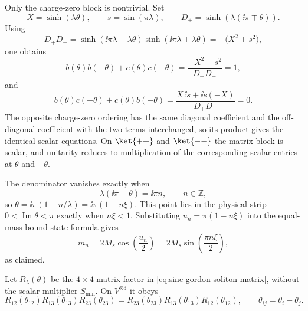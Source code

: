 Only the charge-zero block is nontrivial.  Set
\[
  X=\sinh(\lambda\theta),
  \qquad
  s=\sin(\pi\lambda),
  \qquad
  D_\pm=\sinh(\lambda(\ii\pi\mp\theta)).
\]
Using
\[
  D_+D_-
  =
  \sinh(\ii\pi\lambda-\lambda\theta)
  \sinh(\ii\pi\lambda+\lambda\theta)
  =
  -\bigl(X^2+s^2\bigr),
\]
one obtains
\[
  b(\theta)b(-\theta)+c(\theta)c(-\theta)
  =
  \frac{-X^2-s^2}{D_+D_-}=1,
\]
and
\[
  b(\theta)c(-\theta)+c(\theta)b(-\theta)
  =
  \frac{X\,\ii s+\ii s(-X)}{D_+D_-}=0.
\]
The opposite charge-zero ordering has the same diagonal coefficient and the
off-diagonal coefficient with the two terms interchanged, so its product
gives the identical scalar equations.  On \(\ket{++}\) and \(\ket{--}\) the
matrix block is scalar, and unitarity reduces to multiplication of the
corresponding scalar entries at \(\theta\) and \(-\theta\).

The denominator vanishes exactly when
\[
  \lambda(\ii\pi-\theta)=\ii\pi n,\qquad n\in\mathbb Z,
\]
so \(\theta=\ii\pi(1-n/\lambda)=\ii\pi(1-n\xi)\).  This point lies in the
physical strip \(0<\operatorname{Im}\theta<\pi\) exactly when \(n\xi<1\).
Substituting \(u_n=\pi(1-n\xi)\) into the equal-mass bound-state formula gives
\[
  m_n
  =
  2M_s\cos\!\left(\frac{u_n}{2}\right)
  =
  2M_s\sin\!\left(\frac{\pi n\xi}{2}\right),
\]
as claimed.

\begin{lemma}
\label{lem:sine-gordon-soliton-yang-baxter}
Let \(R_\lambda(\theta)\) be the \(4\times4\) matrix factor in
\eqref{eq:sine-gordon-soliton-matrix}, without the scalar multiplier
\(S_{\mathrm{min}}\).  On \(V^{\otimes3}\) it obeys
\[
  R_{12}(\theta_{12})R_{13}(\theta_{13})R_{23}(\theta_{23})
  =
  R_{23}(\theta_{23})R_{13}(\theta_{13})R_{12}(\theta_{12}),
  \qquad
  \theta_{ij}=\theta_i-\theta_j .
\]
\end{lemma}

